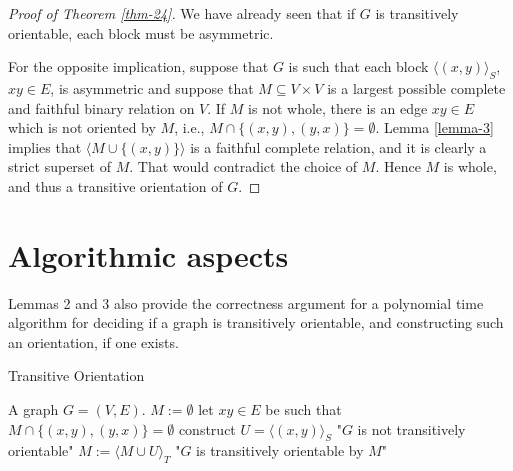 \begin{proof}[Proof of Theorem \ref{thm-24}]
	We have already seen that if $G$ is transitively orientable, each block must be asymmetric.
	
	For the opposite implication, suppose that $G$ is such that each block $\langle(x, y)\rangle_S$, $xy \in E$, is asymmetric and suppose that $M \subseteq V \times V$ is a largest possible complete and faithful binary relation on $V$. If $M$ is not whole, there is an edge $xy \in E$ which is not oriented by $M$, i.e., $M \cap \{(x, y), (y, x)\} = \emptyset$. Lemma \ref{lemma-3} implies that $\langle M \cup \{(x, y)\}\rangle$ is a faithful complete relation, and it is clearly a strict superset of $M$. That would contradict the choice of $M$. Hence $M$ is whole, and thus a transitive orientation of $G$.
\end{proof}

\section{Algorithmic aspects}

Lemmas 2 and 3 also provide the correctness argument for a polynomial time algorithm for deciding if a graph is transitively orientable, and constructing such an orientation, if one exists.

\begin{algorithm}[!ht]
	\caption{Transitive Orientation}
	\begin{algorithmic}[1]
		\Require A graph $G = (V,E)$.
		\State $M := \emptyset$
			\State let $xy \in E$ be such that $M \cap \{(x,y), (y,x)\} = \emptyset$
			\State construct $U = \langle (x,y) \rangle_S$
				\State \Return "$G$ is not transitively orientable"
			\Else
				\State $M := \langle M \cup U \rangle_T$
			\EndIf
		\EndWhile
		\State \Return "$G$ is transitively orientable by $M$"
	\end{algorithmic}
\end{algorithm}
